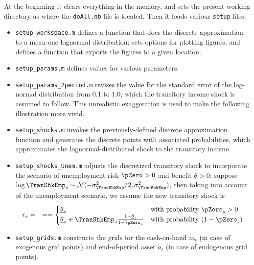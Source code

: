 \documentclass[titlepage,abstract]{\econtex}
\providecommand{\thetaMin}{\underline{\theta}}
\begin{document}
At the beginning it clears everything in the memory, and sets the present working directory as where the \texttt{doAll.nb} file is located. Then it loads various \texttt{setup} files:
\begin{itemize}
      \item \texttt{setup\_workspace.m} defines a function that does the discrete approximation to a mean-one lognormal distribution; sets options for plotting figures; and defines a function that exports the figures to a given location.
      \item \texttt{setup\_params.m} defines values for various parameters.
      \item \texttt{setup\_params\_2period.m} revises the value for the standard error of the log-normal distribution from $0.1$ to $1.0$, which the transitory income shock is assumed to follow. This unrealistic exaggeration is used to make the following illustration more vivid.
      \item \texttt{setup\_shocks.m} invokes the previously-defined discrete approximation function and generates the discrete points with associated probabilities, which approximates the lognormal-distributed shock to the transitory income.
      \item \texttt{setup\_shocks\_Unem.m} adjusts the discretized transitory shock to incorporate the scenario of unemployment risk $\pZero>0$ and benefit $\thetaMin>0$: suppose $\log \TranShkEmp_{s}\thicksim \mathcal{N}(-\sigma_{\TranShkEmp}^{2}/2, \sigma_{\TranShkEmp}^{2})$, then taking into account of the unemployment scenario, we assume the new transitory shock is
          \begin{equation}\begin{gathered}\begin{aligned}
          \epsilon_{s}   &=& =  =  
          \begin{cases}
            \thetaMin_{s} & \text{with probability $\pZero_{s}>0$} \\
            \thetaMin_{s} + \TranShkEmp_{s}\frac{1-\thetaMin_{s}}{1-\pZero_{s}}  & \text{with probability $(1-\pZero_{s})$}
          \end{cases}
          \end{aligned}\end{gathered}\end{equation}
      \item \texttt{setup\_grids.m} constructs the grids for the cash-on-hand $m_{t}$ (in case of exogenous grid points) and end-of-period asset $a_{t}$ (in case of endogenous grid points).

\end{itemize}
\end{document}
